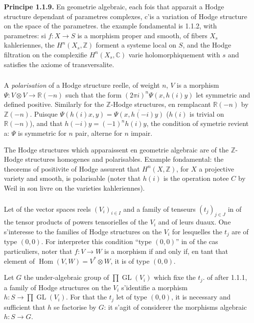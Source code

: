 \documentclass[12pt,a4paper]{article}
\theoremstyle{plain}
\theoremstyle{definition}
\theoremstyle{remark}
\DeclareMathOperator{\Hom}{Hom}
\DeclareMathOperator{\GL}{GL}
\newcommand{\ZZ}{\mathbb{Z}}
\newcommand{\RR}{\mathbb{R}}
\newcommand{\CC}{\mathbb{C}}
\begin{document}
\textbf{Principe 1.1.9.} En geometrie algebraic, each fois that apparait a Hodge structure dependant of parametres complexes, c'is a variation of Hodge structure on the space of the parametres. the example fondamental is 1.1.2, with parametres: si $f:X \to S$ is a morphism proper and smooth, of fibers $X_s$ kahleriennes, the $H^n(X_s,\ZZ)$ forment a systeme local on $S$, and the Hodge filtration on the complexifie $H^n(X_s,\CC)$ varie holomorphiquement with $s$ and satisfies the axiome of transversalite.

\subsubsection{}

A \textit{polarisation} of a Hodge structure reelle, of weight $n$, $V$ is a morphism $\Psi:V \otimes V \to \RR(-n)$ such that the form $(2\pi i)^n \Psi(x, h(i)y)$ let symmetric and defined positive. Similarly for the $\ZZ$-Hodge structures, en remplacant $\RR(-n)$ by $\ZZ(-n)$. Puisque $\Psi(h(i)x, y) = \overline{\Psi(x, h(-i)y)}$ ($h(i)$ is trivial on $\RR(-n)$), and that $h(-i)y = (-1)^n h(i)y$, the condition of symetrie revient a: $\Psi$ is symmetric for $n$ pair, alterne for $n$ impair.

The Hodge structures which apparaissent en geometrie algebraic are of the $\ZZ$-Hodge structures homogenes and polarisables. Example fondamental: the theorems of positivite of Hodge assurent that $H^n(X,\ZZ)$, for $X$ a projective variety and smooth, is polarisable (noter that $h(i)$ is the operation notee $C$ by Weil in son livre on the varieties kahleriennes).

\subsubsection{}

Let of the vector spaces reels $(V_i)_{i \in I}$ and a family of tenseurs $(t_j)_{j \in J}$ in of the tensor products of powers tensorielles of the $V_i$ and of leurs duaux. One s'interesse to the families of Hodge structures on the $V_i$ for lesquelles the $t_j$ are of type $(0,0)$. For interpreter this condition ``type $(0,0)$'' in of the cas particuliers, noter that $f:V \to W$ is a morphism if and only if, en tant that element of $\Hom(V,W) = V^* \otimes W$, it is of type $(0,0)$.

Let $G$ the under-algebraic group of $\prod \GL(V_i)$ which fixe the $t_j$. of after 1.1.1, a family of Hodge structures on the $V_i$ s'identifie a morphism $h:S \to \prod \GL(V_i)$. For that the $t_j$ let of type $(0,0)$, it is necessary and sufficient that $h$ se factorise by $G$: it s'agit of considerer the morphisms algebraic $h:S \to G$.
\end{document}
